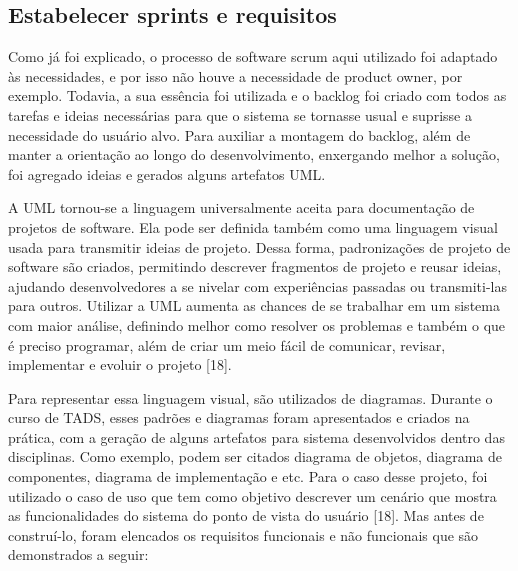 \subsection{Estabelecer sprints e requisitos}

Como já foi explicado, o processo de software scrum aqui utilizado foi adaptado às necessidades, e por isso não houve a necessidade de product owner, por exemplo. Todavia, a sua essência foi utilizada e o backlog foi criado com todos as tarefas e ideias necessárias para que o sistema se tornasse usual e suprisse a necessidade do usuário alvo. Para auxiliar a montagem do backlog, além de manter a orientação ao longo do desenvolvimento, enxergando melhor a solução, foi agregado ideias e gerados alguns artefatos UML. 

A UML tornou-se a linguagem universalmente aceita para documentação de projetos de software. Ela pode ser definida também como uma linguagem visual usada para transmitir ideias de projeto. Dessa forma, padronizações de projeto de software são criados, permitindo descrever fragmentos de projeto e reusar ideias, ajudando desenvolvedores a se nivelar com experiências passadas ou transmiti-las para outros. Utilizar a UML aumenta as chances de se trabalhar em um sistema com maior análise, definindo melhor como resolver os problemas e também o que é preciso programar, além de criar um meio fácil de comunicar, revisar, implementar e evoluir o projeto [18].

Para representar essa linguagem visual, são utilizados de diagramas. Durante o curso de TADS, esses padrões e diagramas foram apresentados e criados na prática, com a geração de alguns artefatos para sistema desenvolvidos dentro das disciplinas. Como exemplo, podem ser citados diagrama de objetos, diagrama de componentes, diagrama de implementação e etc. Para o caso desse projeto, foi utilizado o caso de uso que tem como objetivo descrever um cenário que mostra as funcionalidades do sistema do ponto de vista do usuário [18]. Mas antes de construí-lo, foram elencados os requisitos funcionais e não funcionais que são demonstrados a seguir:


